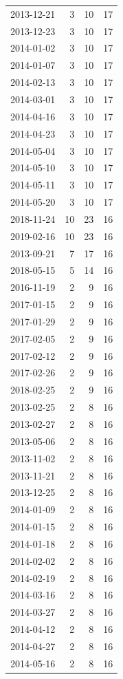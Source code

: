\begin{tabular}{lrrr}
2013-12-21 & 3 & 10 & 17 \\
2013-12-23 & 3 & 10 & 17 \\
2014-01-02 & 3 & 10 & 17 \\
2014-01-07 & 3 & 10 & 17 \\
2014-02-13 & 3 & 10 & 17 \\
2014-03-01 & 3 & 10 & 17 \\
2014-04-16 & 3 & 10 & 17 \\
2014-04-23 & 3 & 10 & 17 \\
2014-05-04 & 3 & 10 & 17 \\
2014-05-10 & 3 & 10 & 17 \\
2014-05-11 & 3 & 10 & 17 \\
2014-05-20 & 3 & 10 & 17 \\
2018-11-24 & 10 & 23 & 16 \\
2019-02-16 & 10 & 23 & 16 \\
2013-09-21 & 7 & 17 & 16 \\
2018-05-15 & 5 & 14 & 16 \\
2016-11-19 & 2 & 9 & 16 \\
2017-01-15 & 2 & 9 & 16 \\
2017-01-29 & 2 & 9 & 16 \\
2017-02-05 & 2 & 9 & 16 \\
2017-02-12 & 2 & 9 & 16 \\
2017-02-26 & 2 & 9 & 16 \\
2018-02-25 & 2 & 9 & 16 \\
2013-02-25 & 2 & 8 & 16 \\
2013-02-27 & 2 & 8 & 16 \\
2013-05-06 & 2 & 8 & 16 \\
2013-11-02 & 2 & 8 & 16 \\
2013-11-21 & 2 & 8 & 16 \\
2013-12-25 & 2 & 8 & 16 \\
2014-01-09 & 2 & 8 & 16 \\
2014-01-15 & 2 & 8 & 16 \\
2014-01-18 & 2 & 8 & 16 \\
2014-02-02 & 2 & 8 & 16 \\
2014-02-19 & 2 & 8 & 16 \\
2014-03-16 & 2 & 8 & 16 \\
2014-03-27 & 2 & 8 & 16 \\
2014-04-12 & 2 & 8 & 16 \\
2014-04-27 & 2 & 8 & 16 \\
2014-05-16 & 2 & 8 & 16 \\

\end{tabular}
